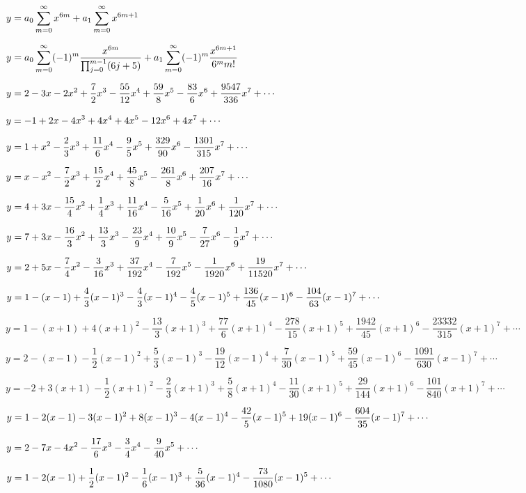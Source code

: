 $y=\displaystyle{a_0\sum_{m=0}^\infty x^{6m}+a_1\sum_{m=0}^\infty x^{6m+1}}$

$y=\displaystyle{a_0\sum_{m=0}^\infty(-1)^m\frac{x^{6m}}{\prod_{j=0}^{m-1}(6j+5)}+
a_1\sum_{m=0}^\infty(-1)^m\frac{x^{6m+1}}{6^mm!}}$



$y=\displaystyle{2-3x-2x^2+\frac{7}{2}x^3-\frac{55}{12}x^4+\frac{59}{8}x^5-\frac{83}{6}x^6
+\frac{9547}{336}x^7+\cdots}$

$y=\displaystyle{-1+2x-4x^3+4x^4+4x^5-12x^6+4x^7+\cdots}$

$y=\displaystyle{1+x^2-\frac{2}{3}x^3+\frac{11}{6}x^4-\frac{9}{5}x^5+
\frac{329}{90}x^6-\frac{1301}{315}x^7+\cdots}$

$y=\displaystyle{x-x^2-\frac{7}{2}x^3+\frac{15}{2}x^4+\frac{45}{8}x^5
-\frac{261}{8}x^6+\frac{207}{16}x^7+\cdots}$

$y=\displaystyle{4+3x-\frac{15}{4}x^2+\frac{1}{4}x^3+\frac{11}{16}x^4-\frac{5}{16}x^5
+\frac{1}{20}x^6+\frac{1}{120}x^7+\cdots}$

$y=\displaystyle{7+3x-\frac{16}{3}x^2+\frac{13}{3}x^3-\frac{23}{9}x^4+\frac{10}{9}x^5
-\frac{7}{27}x^6-\frac{1}{9}x^7+\cdots}$

$y=\displaystyle{2+5x-\frac{7}{4}x^2-\frac{3}{16}x^3+\frac{37}{192}x^4
-\frac{7}{192}x^5-\frac{1}{1920}x^6+\frac{19}{11520}x^7+\cdots}$

$y=\displaystyle{1-(x-1)+\frac{4}{3}(x-1)^3-\frac{4}{3}(x-1)^4-\frac{4}{5}(x-1)^5
+\frac{136}{45}(x-1)^6-\frac{104}{63}(x-1)^7+\cdots}$

$y=1-(x+1)+4(x+1)^2-\dfrac{13}{3}(x+1)^3+\dfrac{77}{6}(x+1)^4
-\dfrac{278}{15}(x+1)^5+\dfrac{1942}{45}(x+1)^6-\dfrac{23332}{315}(x+1)^7+\cdots$

$y=2-(x-1)-\dfrac{1}{2}(x-1)^2+\dfrac{5}{3}(x-1)^3-\dfrac{19}{12}(x-1)^4
+\dfrac{7}{30}(x-1)^5+\dfrac{59}{45}(x-1)^6-\dfrac{1091}{630}(x-1)^7+\cdots$

$y=-2+3(x+1)-\dfrac{1}{2}(x+1)^2-\dfrac{2}{3}(x+1)^3+\dfrac{5}{8}(x+1)^4
-\dfrac{11}{30}(x+1)^5+\dfrac{29}{144}(x+1)^6-\dfrac{101}{840}(x+1)^7+\cdots$

$y=\displaystyle{1-2(x-1)-3(x-1)^2+8(x-1)^3-4(x-1)^4-\frac{42}{5}(x-1)^5
+19(x-1)^6-\frac{604}{35}(x-1)^7+\cdots}$

$y=\displaystyle{2-7x-4x^2-\frac{17}{6}x^3-\frac{3}{4}x^4-\frac{9}{40}x^5+\cdots}$

$y=\displaystyle{1-2(x-1)+\frac{1}{2}(x-1)^2-\frac{1}{6}(x-1)^3+\frac{5}{36}(x-1)^4
-\frac{73}{1080}(x-1)^5+\cdots}$

